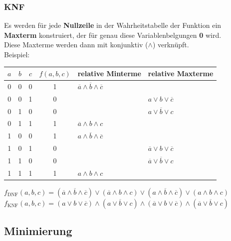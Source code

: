 \documentclass[12pt]{article}
\begin{document}
\subsubsection{KNF}
Es werden für jede \textbf{Nullzeile} in der Wahrheitstabelle der Funktion ein \textbf{Maxterm} konstruiert, der für genau diese Variablenbelgungen \textbf{0} wird. \\
Diese Maxterme werden dann mit konjunktiv ($\land$) verknüpft. \\
\newline
Beispiel:
\begin{center}
    \begin{tabular}{|c c c|c|l|l|}
        \hline
        $a$ & $b$ & $c$ & $f(a,b,c)$ & relative Minterme & relative Maxterme \\
        \hline
        0 & 0 & 0 & 1 & $\overline{a} \land \overline{b} \land \overline{c}$ & \\
        0 & 0 & 1 & 0 & & $a \lor b \lor \overline{c}$ \\
        0 & 1 & 0 & 0 & & $a \lor \overline{b} \lor c$ \\
        0 & 1 & 1 & 1 & $\overline{a} \land b \land c$ & \\
        1 & 0 & 0 & 1 & $a \land \overline{b} \land \overline{c}$ & \\
        1 & 0 & 1 & 0 & & $\overline{a} \lor b \lor \overline{c}$ \\
        1 & 1 & 0 & 0 & & $\overline{a} \lor \overline{b} \lor c$ \\
        1 & 1 & 1 & 1 & $a \land b \land c$ & \\
        \hline
    \end{tabular}
\end{center}
$f_{\text{DNF}}(a,b,c) = (\overline{a} \land \overline{b} \land \overline{c}) \lor (\overline{a} \land b \land c) \lor (a \land \overline{b} \land \overline{c}) \lor (a \land b \land c)$ \\
$f_{\text{KNF}}(a,b,c) = (a \lor b \lor \overline{c}) \land (a \lor \overline{b} \lor c) \land (\overline{a} \lor b \lor \overline{c}) \land (\overline{a} \lor \overline{b} \lor c)$
\subsection{Minimierung}
\end{document}
